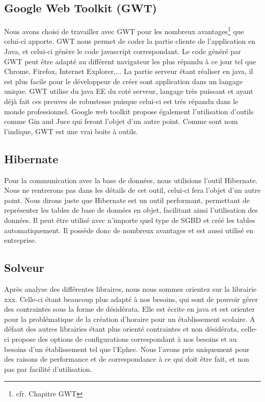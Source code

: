 \subsection{Google Web Toolkit (GWT)}

Nous avons choisi de travailler avec GWT pour les nombreux avantages\footnote{cfr. Chapitre GWT} que celui-ci apporte. GWT nous permet de coder la partie cliente de l'application en Java, et celui-ci génère le code javascript correspondant. Le code généré par GWT peut être adapté au différent navigateur les plus répandu à ce jour tel que Chrome, Firefox, Internet Explorer,... La partie serveur étant réaliser en java, il est plus facile pour le développeur de créer sont application dans un langage unique. GWT utilise du java EE du coté serveur, langage très puissant et ayant déjà fait ces preuves de robustesse puisque celui-ci est très répandu dans le monde professionnel. Google web toolkit propose également l'utilisation d'outils comme Gin and Juce qui feront l'objet d'un autre point. Comme sont nom l'indique, GWT est une vrai boite à outils.

\subsection{Hibernate}
Pour la communication avec la base de données, nous utilisions l'outil Hibernate. Nous ne rentrerons pas dans les détails de cet outil, celui-ci fera l'objet d'un autre point. Nous dirons juste que Hibernate est un outil performant, permettant de représenter les tables de base de données en objet, facilitant ainsi l'utilisation des données. Il peut être utilisé avec n'importe quel type de SGBD et créé les tables automatiquement. Il possède donc de nombreux avantages et est aussi utilisé en entreprise.

\subsection{Solveur}

Après analyse des différentes libraires, nous nous sommes orientez sur la
librairie xxx. Celle-ci étant beaucoup plus adapté à nos besoins, qui sont de
pouvoir gérer des contraintes sous la forme de désidérata. Elle est écrite en java et est orienter pour la problématique de la création d'horaire pour un établissement scolaire. A défaut des autres librairies étant plus orienté contraintes et non désidérata, celle-ci propose des options de configurations correspondant à nos besoins et au besoins d'un établissement tel que l'Ephec. Nous l'avons pris uniquement pour des raisons de performance et de correspondance à ce qui doit être fait, et non pas par facilité d'utilisation.

